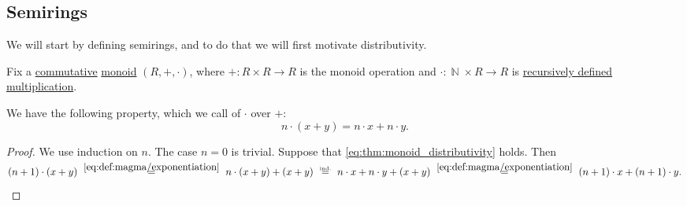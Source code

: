 \subsection{Semirings}\label{subsec:semirings}

We will start by defining semirings, and to do that we will first motivate distributivity.

\begin{proposition}\label{thm:monoid_distributivity}
  Fix a \hyperref[def:magma/commutative]{commutative} \hyperref[def:monoid]{monoid} \( (R, +, \cdot) \), where \( +: R \times R \to R \) is the monoid operation and \( \cdot: \BbbN \times R \to R \) is \hyperref[rem:additive_magma/multiplication]{recursively defined multiplication}.

  We have the following property, which we call  of \( \cdot \) over \( + \):
  \begin{equation}\label{eq:thm:monoid_distributivity}
    n \cdot (x + y) = n \cdot x + n \cdot y.
  \end{equation}
\end{proposition}
\begin{proof}
  We use induction on \( n \). The case \( n = 0 \) is trivial. Suppose that \eqref{eq:thm:monoid_distributivity} holds. Then
  \begin{equation*}
    (n + 1) \cdot (x + y)
    \reloset {\eqref{eq:def:magma/exponentiation}} =
    n \cdot (x + y) + (x + y)
    \reloset {\T{ind.}} =
    n \cdot x + n \cdot y + (x + y)
    \reloset {\eqref{eq:def:magma/exponentiation}} =
    (n + 1) \cdot x + (n + 1) \cdot y.
  \end{equation*}
\end{proof}

